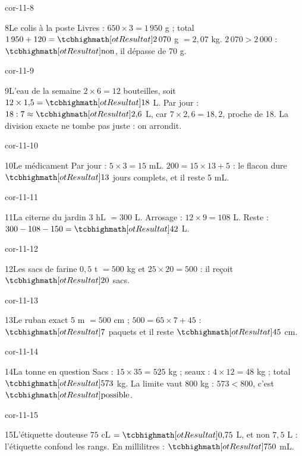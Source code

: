 \begin{blocLivre}{cor-11-8}\begin{corrige}{8}{Le colis à la poste}
Livres : $650\times3=1\,950$ g ; total $1\,950+120=\res{2\,070}$ g $=2{,}07$ kg. $2\,070>2\,000$ : $\res{\text{non}}$, il dépasse de 70 g.
\end{corrige}\end{blocLivre}
\begin{blocLivre}{cor-11-9}\begin{corrige}{9}{L’eau de la semaine}
$2\times6=12$ bouteilles, soit $12\times1{,}5=\res{18}$ L. Par jour : $18:7\approx\res{2{,}6}$ L, car $7\times2{,}6=18{,}2$, proche de 18. La division exacte ne tombe pas juste : on arrondit.
\end{corrige}\end{blocLivre}
\begin{blocLivre}{cor-11-10}\begin{corrige}{10}{Le médicament}
Par jour : $5\times3=15$ mL. $200=15\times13+5$ : le flacon dure $\res{13}$ jours complets, et il reste 5 mL.
\end{corrige}\end{blocLivre}
\begin{blocLivre}{cor-11-11}\begin{corrige}{11}{La citerne du jardin}
$3$ hL $=300$ L. Arrosage : $12\times9=108$ L. Reste : $300-108-150=\res{42}$ L.
\end{corrige}\end{blocLivre}
\begin{blocLivre}{cor-11-12}\begin{corrige}{12}{Les sacs de farine}
$0{,}5$ t $=500$ kg et $25\times20=500$ : il reçoit $\res{20}$ sacs.
\end{corrige}\end{blocLivre}
\begin{blocLivre}{cor-11-13}\begin{corrige}{13}{Le ruban exact}
5 m $=500$ cm ; $500=65\times7+45$ : $\res7$ paquets et il reste $\res{45}$ cm.
\end{corrige}\end{blocLivre}
\begin{blocLivre}{cor-11-14}\begin{corrige}{14}{La tonne en question}
Sacs : $15\times35=525$ kg ; seaux : $4\times12=48$ kg ; total $\res{573}$ kg. La limite vaut 800 kg : $573<800$, c’est $\res{\text{possible}}$.
\end{corrige}\end{blocLivre}
\begin{blocLivre}{cor-11-15}\begin{corrige}{15}{L’étiquette douteuse}
$75$ cL $=\res{0{,}75}$ L, et non $7{,}5$ L : l’étiquette confond les rangs. En millilitres : $\res{750}$ mL.
\end{corrige}\end{blocLivre}
